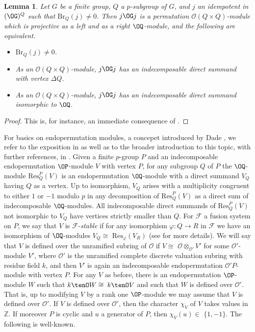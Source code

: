\documentclass{amsart} %
\theoremstyle{plain}\newtheorem{Theorem}{Theorem}[section]
\theoremstyle{plain}\newtheorem{Conjecture}[Theorem]{Conjecture}
\theoremstyle{plain}\newtheorem{Corollary}[Theorem]{Corollary}
\theoremstyle{plain}\newtheorem{Lemma}[Theorem]{Lemma}
\theoremstyle{plain}\newtheorem{Proposition}[Theorem]{Proposition}
\theoremstyle{definition}\newtheorem{Definition}[Theorem]{Definition}
\theoremstyle{definition}\newtheorem{Example}[Theorem]{Example}
\theoremstyle{definition}\newtheorem{Examples}[Theorem]{Examples}
\theoremstyle{definition}\newtheorem{Remark}[Theorem]{Remark}
\theoremstyle{definition}\newtheorem{Remarks}[Theorem]{Remarks}
\theoremstyle{plain}\newtheorem{Statement}[Theorem]{}
\def\CF{{\mathcal{F}}}    \def\OS{{\mathcal{O}S}}
\def\CO{{\mathcal{O}}}
\def\Z{{\mathbb Z}}
\def\Br{\mathrm{Br}}             \def\ten{\otimes}
\def\Res{\mathrm{Res}}           \def\tenOR{\otimes_{\mathcal{O}R}}
\begin{document}
\begin{Lemma} \label{lem25}
Let $G$ be a finite group, $Q$ a $p$-subgroup of $G$, and $j$ an idempotent
in $(\OG)^Q$ such that $\Br_Q(j)\neq 0$. Then $j\OG j$ is a permutation
$\CO(Q\times Q)$-module  which is projective as a left and as a right
$\OQ$-module, and the following are equivalent.
\begin{itemize}
\item[{\rm (i)}]  $\Br_Q(j) \neq 0$.
\item[{\rm (ii)}] As an $\CO(Q\times Q)$-module, $j\OG j$ has an indecomposable
direct summand with vertex $\Delta Q$.
\item[{\rm (iii)}] As an $\CO(Q\times Q)$-module, $j\OG j$ has an indecomposable
direct summand isomorphic to $\OQ$.
\end{itemize}
\end{Lemma}

\begin{proof}
This  is, for instance, an immediate consequence of \cite[Lemma 5.8.8]{LiBookI}.
\end{proof}

\medskip
For basics on endopermutation modules, a concepet introduced by Dade
 \cite{Dadeendo}, we refer to the exposition in 
\cite[Section 7.3]{LiBookII} as well as to the broader introduction to this
topic, with further references,  in \cite{Thevtour}.
Given a finite $p$-group $P$ and an 
indecomposable endopermutation $\OP$-module $V$ with vertex $P$,
for any subgroup $Q$ of $P$ the $\OQ$-module $\Res^P_Q(V)$ is an
endopermutation $\OQ$-module with a direct summand $V_Q$ having
$Q$ as a vertex. Up to isomorphism, $V_Q$ arises with a multiplicity 
congruent to either $1$ or $-1$ modulo $p$ in any decomposition
of $\Res^P_Q(V)$ as a direct sum of indecomposable $\OQ$-modules.
All indecomposable direct summands of $\Res^P_Q(V)$
not isomorphic to $V_Q$ have vertices strictly smaller than $Q$.
For $\CF$ a fusion system on $P$, we say that $V$ is $\CF$-{\em stable}
if for any isomorphism $\varphi : Q\to R$ in $\CF$ we have an
isomorphism of $\OQ$-modules $V_Q\cong$ $\Res_\varphi(V_R)$
(see \cite[Section 9.9]{LiBookII} for more details).  
We will say that $V$ is defined over the unramified subring  of $\CO$ 
 if $V\cong$ $\CO\ten_{\CO'} V'$ for some
$\CO'$-module $V'$, where $\CO'$ is the unramified complete discrete valuation
subring with residue field $k$,  and then $V'$ is again an indecomposable endopermutation 
$\CO' P$-module with vertex $P$. For any $V$ as before, there is an endopermutation
$\OP$-module $W$ such that $k\tenO W\cong$ $k\tenO V$ and such that $W$ is
defined over $\CO'$. That is, up to modifying $V$ by a rank one $\OP$-module we may
assume that $V$ is defined over $\CO'$. If $V$ is defined over $\CO'$, then the
character $\chi_V$ of $V$ takes values in $\Z$. 
If moreover $P$ is cyclic and $u$ a generator of $P$, then $\chi_V(u)\in$ $\{1,-1\}$.
The following is well-known.
\end{document}
